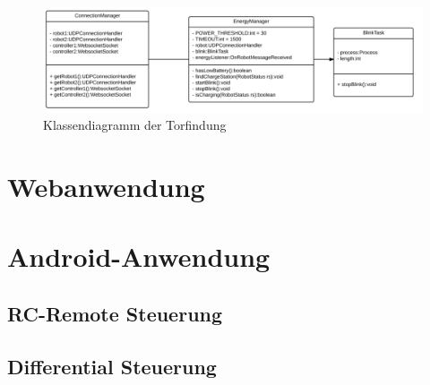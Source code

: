 \begin{figure}[h]
	\includegraphics[width=\textwidth]{images/uml_energymanager.pdf}
	\caption{Klassendiagramm der Torfindung}
	\label{fig:uml_energymanager}
\end{figure}




\section{Webanwendung}
\label{sec:webanwendung}

\section{Android-Anwendung}
\subsection{RC-Remote Steuerung}
\subsection{Differential Steuerung}
\label{sec:differentialsteuerung}

